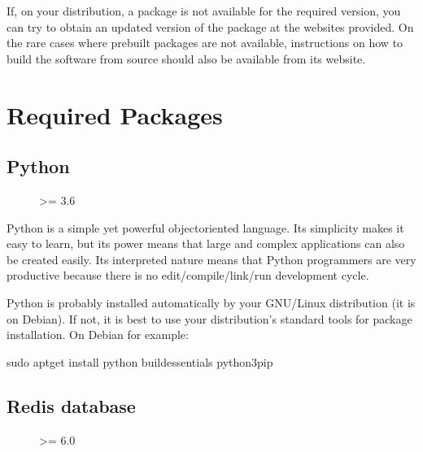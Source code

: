 \documentclass[letterpaper,10pt,english]{sphinxmanual}
\begin{document}
If, on your distribution, a package is not available for the required version, you can try to obtain an updated version of the package at the web\sphinxhyphen{}sites provided. On the rare cases where pre\sphinxhyphen{}built packages are not available, instructions on how to build the software from source should also be available from its web\sphinxhyphen{}site.


\section{Required Packages}
\label{\detokenize{install:required-packages}}

\subsection{Python}
\label{\detokenize{install:python}}\begin{description}
\item[{}] \leavevmode
{}

\item[{}] \leavevmode
\textgreater{}= 3.6

\end{description}

Python is a simple yet powerful object\sphinxhyphen{}oriented language. Its simplicity makes it easy to learn, but its power means that large and complex applications can also be created easily. Its interpreted nature means that Python programmers are very productive because there is no edit/compile/link/run development cycle.

Python is probably installed automatically by your GNU/Linux distribution (it is on Debian). If not, it is best to use your distribution’s standard tools for package installation. On Debian for example:

\begin{sphinxVerbatim}[commandchars=\\\{\}]
\PYGZdl{} sudo apt\PYGZhy{}get install python build\PYGZhy{}essentials python3\PYGZhy{}pip
\end{sphinxVerbatim}


\subsection{Redis database}
\label{\detokenize{install:redis-database}}\begin{description}
\item[{}] \leavevmode
{}

\item[{}] \leavevmode
\textgreater{}= 6.0

\end{description}
\end{document}
